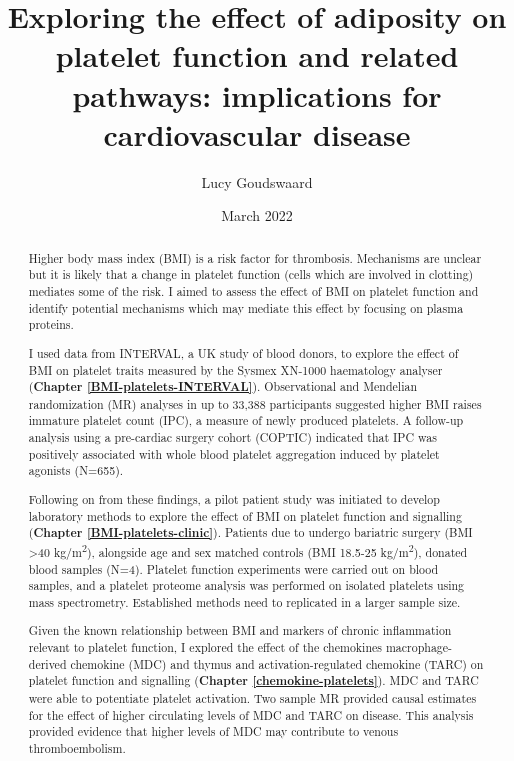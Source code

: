 \documentclass[11pt,twoside]{bristolthesis}
\title{Exploring the effect of adiposity on platelet function and related pathways: implications for cardiovascular disease}
\author{Lucy Goudswaard}
\date{March 2022}
\begin{document}
  \maketitle

\frontmatter %
\pagestyle{empty} %
\begingroup
  \begin{abstract}
    Higher body mass index (BMI) is a risk factor for thrombosis. Mechanisms are unclear but it is likely that a change in platelet function (cells which are involved in clotting) mediates some of the risk. I aimed to assess the effect of BMI on platelet function and identify potential mechanisms which may mediate this effect by focusing on plasma proteins.

    I used data from INTERVAL, a UK study of blood donors, to explore the effect of BMI on platelet traits measured by the Sysmex XN-1000 haematology analyser (\textbf{Chapter \ref{BMI-platelets-INTERVAL}}). Observational and Mendelian randomization (MR) analyses in up to 33,388 participants suggested higher BMI raises immature platelet count (IPC), a measure of newly produced platelets. A follow-up analysis using a pre-cardiac surgery cohort (COPTIC) indicated that IPC was positively associated with whole blood platelet aggregation induced by platelet agonists (N=655).

    Following on from these findings, a pilot patient study was initiated to develop laboratory methods to explore the effect of BMI on platelet function and signalling (\textbf{Chapter \ref{BMI-platelets-clinic}}). Patients due to undergo bariatric surgery (BMI \textgreater40 kg/m\textsuperscript{2}), alongside age and sex matched controls (BMI 18.5-25 kg/m\textsuperscript{2}), donated blood samples (N=4). Platelet function experiments were carried out on blood samples, and a platelet proteome analysis was performed on isolated platelets using mass spectrometry. Established methods need to replicated in a larger sample size.

    Given the known relationship between BMI and markers of chronic inflammation relevant to platelet function, I explored the effect of the chemokines macrophage-derived chemokine (MDC) and thymus and activation-regulated chemokine (TARC) on platelet function and signalling (\textbf{Chapter \ref{chemokine-platelets}}). MDC and TARC were able to potentiate platelet activation. Two sample MR provided causal estimates for the effect of higher circulating levels of MDC and TARC on disease. This analysis provided evidence that higher levels of MDC may contribute to venous thromboembolism.


\end{abstract}
\end{document}
